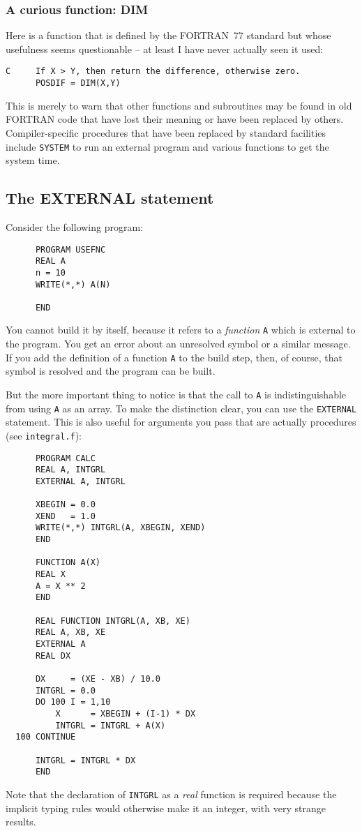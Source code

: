 \subsubsection{A curious function: DIM}
Here is a function that is defined by the FORTRAN~77 standard but whose usefulness
seems questionable -- at least I have never actually seen it used:
%
\begin{verbatim}
C     If X > Y, then return the difference, otherwise zero.
      POSDIF = DIM(X,Y)
\end{verbatim}

This is merely to warn that other functions and subroutines may be found
in old FORTRAN code that have lost their meaning or have been replaced by others.
Compiler-specific procedures that have been replaced by standard facilities include
\verb+SYSTEM+ to run an external program and various functions to get the system time.


\subsection{The EXTERNAL statement}
Consider the following program:
%
\begin{verbatim}
      PROGRAM USEFNC
      REAL A
      n = 10
      WRITE(*,*) A(N)

      END
\end{verbatim}

You cannot build it by itself, because it refers to a \emph{function} \verb+A+ which is external
to the program. You get an error about an unresolved symbol or a similar message.
If you add the definition of a function \verb+A+ to the build step, then, of course,
that symbol is resolved and the program can be built.

But the more important thing to notice is that the call to \verb+A+ is indistinguishable
from using \verb+A+ as an array. To make the distinction clear, you can use the
\verb+EXTERNAL+ statement. This is also useful for arguments you pass that are actually
procedures (see \verb+integral.f+):
%
\begin{verbatim}
      PROGRAM CALC
      REAL A, INTGRL
      EXTERNAL A, INTGRL

      XBEGIN = 0.0
      XEND   = 1.0
      WRITE(*,*) INTGRL(A, XBEGIN, XEND)
      END

      FUNCTION A(X)
      REAL X
      A = X ** 2
      END

      REAL FUNCTION INTGRL(A, XB, XE)
      REAL A, XB, XE
      EXTERNAL A
      REAL DX

      DX     = (XE - XB) / 10.0
      INTGRL = 0.0
      DO 100 I = 1,10
          X      = XBEGIN + (I-1) * DX
          INTGRL = INTGRL + A(X)
  100 CONTINUE

      INTGRL = INTGRL * DX
      END
\end{verbatim}
%
Note that the declaration of \verb+INTGRL+ as a \emph{real} function is required
because the implicit typing rules would otherwise make it an integer, with very
strange results.


